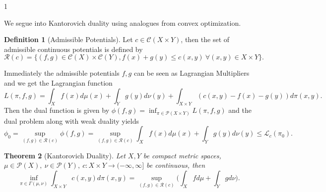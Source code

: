 \documentclass[12pt]{article}
\newtheorem{theorem}{Theorem}[section]
\theoremstyle{definition}
\newtheorem{definition}[theorem]{Definition}
\theoremstyle{plain}
\begin{document}
\begin{spacing}{1}
{\newpage
We segue into Kantorovich duality using analogues from convex optimization.

\begin{definition}[Admissible Potentials]
    Let $c \in \mathcal{C}(X \times Y)$, then the set of admissible continuous potentials is defined by
    \[
    \mathcal{R}(c) = \{(f, g) \in \mathcal{C}(X) \times \mathcal{C}(Y), f(x) + g(y) \leq c(x, y) \ \forall (x, y) \in X \times Y\}.
    \]
\end{definition}

Immediately the admissible potentials $f, g$ can be seen as Lagrangian Multipliers and we get the Lagrangian function
\[
L(\pi, f, g) = \displaystyle \int_X f(x) d\mu(x) + \int_Y g(y) d\nu(y) + \int_{X \times Y} (c(x, y) - f(x) - g(y))d\pi(x, y).
\]
Then the dual function is given by $\phi(f, g) = \inf_{\pi \in \mathcal{P}(X \times Y)} L(\pi, f, g)$ and the dual problem along with weak duality yields 
\[
\phi_0 = \sup_{(f, g)\in \mathcal{R}(c)} \phi(f, g) = \sup_{(f, g)\in \mathcal{R}(c)} \displaystyle \int_X f(x) d\mu(x) + \int_Y g(y) d\nu(y) \leq \mathcal{L}_c(\pi_0).
\]

\begin{theorem}[Kantorovich Duality]
    Let $X, Y$ be compact metric spaces, $\mu \in \mathcal{P}(X), \ \nu \in \mathcal{P}(Y), \ c: X \times Y \rightarrow (-\infty, \infty]$ be continuous, then
    \[
    \inf_{\pi \in \Gamma(\mu, \nu)} \displaystyle \int_{X \times Y} c(x, y) d\pi(x, y) = \sup_{(f, g) \in \mathcal{R}(c)} \bigg( \int_X f d\mu + \int_Y g d\nu\bigg).
    \]
\end{theorem}

}
\end{spacing}
\end{document}
